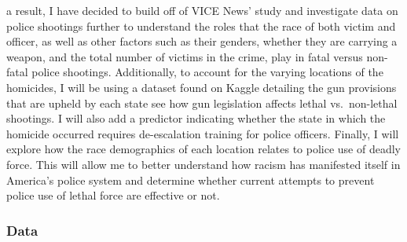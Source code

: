 \documentclass[
]{article}
\begin{document}
a result, I have decided to build off of VICE News' study and
investigate data on police shootings further to understand the roles
that the race of both victim and officer, as well as other factors such
as their genders, whether they are carrying a weapon, and the total
number of victims in the crime, play in fatal versus non-fatal police
shootings. Additionally, to account for the varying locations of the
homicides, I will be using a dataset found on Kaggle detailing the gun
provisions that are upheld by each state see how gun legislation affects
lethal vs.~non-lethal shootings. I will also add a predictor indicating
whether the state in which the homicide occurred requires de-escalation
training for police officers. Finally, I will explore how the race
demographics of each location relates to police use of deadly force.
This will allow me to better understand how racism has manifested itself
in America's police system and determine whether current attempts to
prevent police use of lethal force are effective or not.

\hypertarget{data}{%
\subsubsection{Data}\label{data}}
\end{document}
